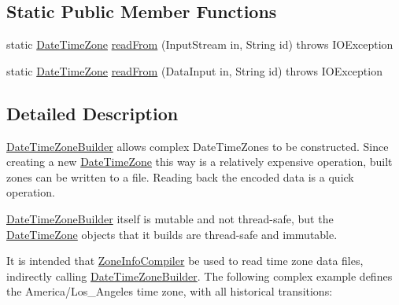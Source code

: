 \subsection*{Static Public Member Functions}
\begin{DoxyCompactItemize}
\item 
static \hyperlink{classorg_1_1joda_1_1time_1_1_date_time_zone}{Date\-Time\-Zone} \hyperlink{classorg_1_1joda_1_1time_1_1tz_1_1_date_time_zone_builder_af7291f6dafbf0aee17f35c9e78a0228c}{read\-From} (Input\-Stream in, String id)  throws I\-O\-Exception 
\item 
static \hyperlink{classorg_1_1joda_1_1time_1_1_date_time_zone}{Date\-Time\-Zone} \hyperlink{classorg_1_1joda_1_1time_1_1tz_1_1_date_time_zone_builder_a9c0ba128a11346b0ca102f5cd8cf0505}{read\-From} (Data\-Input in, String id)  throws I\-O\-Exception 
\end{DoxyCompactItemize}


\subsection{Detailed Description}
\hyperlink{classorg_1_1joda_1_1time_1_1tz_1_1_date_time_zone_builder}{Date\-Time\-Zone\-Builder} allows complex Date\-Time\-Zones to be constructed. Since creating a new \hyperlink{classorg_1_1joda_1_1time_1_1_date_time_zone}{Date\-Time\-Zone} this way is a relatively expensive operation, built zones can be written to a file. Reading back the encoded data is a quick operation. 

\hyperlink{classorg_1_1joda_1_1time_1_1tz_1_1_date_time_zone_builder}{Date\-Time\-Zone\-Builder} itself is mutable and not thread-\/safe, but the \hyperlink{classorg_1_1joda_1_1time_1_1_date_time_zone}{Date\-Time\-Zone} objects that it builds are thread-\/safe and immutable. 

It is intended that \hyperlink{classorg_1_1joda_1_1time_1_1tz_1_1_zone_info_compiler}{Zone\-Info\-Compiler} be used to read time zone data files, indirectly calling \hyperlink{classorg_1_1joda_1_1time_1_1tz_1_1_date_time_zone_builder}{Date\-Time\-Zone\-Builder}. The following complex example defines the America/\-Los\-\_\-\-Angeles time zone, with all historical transitions\-:


